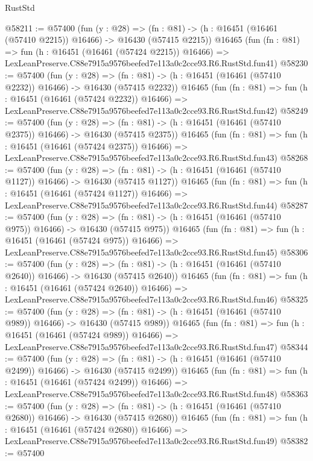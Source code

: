 \begin{lexlean}{RustStd}
\begin{coremodule}
@58211 := @57400
    (fun (y : @28) =>
    (fn : @81) -> (h : @16451 (@16461 (@57410 @2215)) @16466) -> @16430 (@57415 @2215))
    @16465
    (fun (fn : @81) =>
    fun (h : @16451 (@16461 (@57424 @2215)) @16466) =>
    LexLeanPreserve.C88e7915a9576beefed7e113a0c2cce93.R6.RustStd.fun41)
@58230 := @57400
    (fun (y : @28) =>
    (fn : @81) -> (h : @16451 (@16461 (@57410 @2232)) @16466) -> @16430 (@57415 @2232))
    @16465
    (fun (fn : @81) =>
    fun (h : @16451 (@16461 (@57424 @2232)) @16466) =>
    LexLeanPreserve.C88e7915a9576beefed7e113a0c2cce93.R6.RustStd.fun42)
@58249 := @57400
    (fun (y : @28) =>
    (fn : @81) -> (h : @16451 (@16461 (@57410 @2375)) @16466) -> @16430 (@57415 @2375))
    @16465
    (fun (fn : @81) =>
    fun (h : @16451 (@16461 (@57424 @2375)) @16466) =>
    LexLeanPreserve.C88e7915a9576beefed7e113a0c2cce93.R6.RustStd.fun43)
@58268 := @57400
    (fun (y : @28) =>
    (fn : @81) -> (h : @16451 (@16461 (@57410 @1127)) @16466) -> @16430 (@57415 @1127))
    @16465
    (fun (fn : @81) =>
    fun (h : @16451 (@16461 (@57424 @1127)) @16466) =>
    LexLeanPreserve.C88e7915a9576beefed7e113a0c2cce93.R6.RustStd.fun44)
@58287 := @57400
    (fun (y : @28) =>
    (fn : @81) -> (h : @16451 (@16461 (@57410 @975)) @16466) -> @16430 (@57415 @975))
    @16465
    (fun (fn : @81) =>
    fun (h : @16451 (@16461 (@57424 @975)) @16466) =>
    LexLeanPreserve.C88e7915a9576beefed7e113a0c2cce93.R6.RustStd.fun45)
@58306 := @57400
    (fun (y : @28) =>
    (fn : @81) -> (h : @16451 (@16461 (@57410 @2640)) @16466) -> @16430 (@57415 @2640))
    @16465
    (fun (fn : @81) =>
    fun (h : @16451 (@16461 (@57424 @2640)) @16466) =>
    LexLeanPreserve.C88e7915a9576beefed7e113a0c2cce93.R6.RustStd.fun46)
@58325 := @57400
    (fun (y : @28) =>
    (fn : @81) -> (h : @16451 (@16461 (@57410 @989)) @16466) -> @16430 (@57415 @989))
    @16465
    (fun (fn : @81) =>
    fun (h : @16451 (@16461 (@57424 @989)) @16466) =>
    LexLeanPreserve.C88e7915a9576beefed7e113a0c2cce93.R6.RustStd.fun47)
@58344 := @57400
    (fun (y : @28) =>
    (fn : @81) -> (h : @16451 (@16461 (@57410 @2499)) @16466) -> @16430 (@57415 @2499))
    @16465
    (fun (fn : @81) =>
    fun (h : @16451 (@16461 (@57424 @2499)) @16466) =>
    LexLeanPreserve.C88e7915a9576beefed7e113a0c2cce93.R6.RustStd.fun48)
@58363 := @57400
    (fun (y : @28) =>
    (fn : @81) -> (h : @16451 (@16461 (@57410 @2680)) @16466) -> @16430 (@57415 @2680))
    @16465
    (fun (fn : @81) =>
    fun (h : @16451 (@16461 (@57424 @2680)) @16466) =>
    LexLeanPreserve.C88e7915a9576beefed7e113a0c2cce93.R6.RustStd.fun49)
@58382 := @57400

\end{coremodule}
\end{lexlean}
